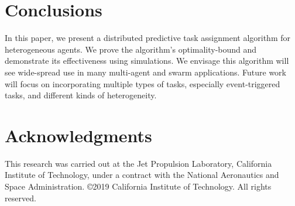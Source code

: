 \documentclass[conference]{IEEEtran}
\newcommand{\mpmargin}[2]{{\color{cyan}#1}\marginpar{\color{cyan}\raggedright\footnotesize [MP]:#2}}
\newcommand{\frline}[2]{{\color{blue}#1}{\em \color{blue}[FR]: #2}}
\newcommand{\mpmargin}[2]{#1}
\newcommand{\frline}[2]{#1}
\begin{document}

\section{Conclusions}\label{sec:future}
In this paper, we present a distributed predictive task assignment algorithm for heterogeneous agents. 
We prove the algorithm's optimality-bound and demonstrate its effectiveness using simulations. 
We envisage this algorithm will see wide-spread use in many multi-agent and swarm applications. 
Future work will focus on incorporating multiple types of tasks, especially event-triggered tasks, and different kinds of heterogeneity.  


\section*{Acknowledgments}
This research was carried out at the Jet Propulsion Laboratory, California Institute of Technology, under a contract with the National Aeronautics and Space Administration. 
\copyright 2019 California Institute of Technology. All rights reserved.
\end{document}
